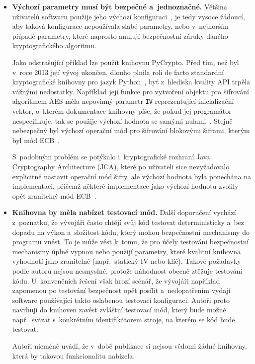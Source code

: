 \begin{itemize}
    \item \textbf{Výchozí parametry musí být bezpečné a~jednoznačné.} \enskip
        Většina uživatelů softwaru použije jeho výchozí konfiguraci~\cite{Daswani2007}, je tedy vysoce žádoucí, aby taková konfigurace nepoužívala slabé parametry, nebo v~nejhorším případě parametry, které naprosto anulují bez\-peč\-nost\-ní záruky daného kryptografického algoritmu.

        Jako odstrašující příklad lze použít knihovnu PyCrypto. Před tím, než byl v~roce 2013 její vývoj ukončen, dlouho plnila roli de facto standardní kryptografické knihovny pro jazyk Python~\cite{keckmasters}, byť z~hlediska kvality API trpěla vážnými nedostatky. Například její funkce pro vytvoření objektu pro šifrování algoritmem AES měla nepovinný parametr \texttt{IV} reprezentující inicializační vektor, o~kterém dokumentace knihovny píše, že pokud jej programátor nespecifikuje, tak se použije výchozí hodnota se samými nulami~\cite{pycryptodoc}. Stejně nebezpečný byl výchozí operační mód pro šifrování blokovými šiframi, kterým byl mód ECB~\cite{das2014iv}.

        S~podobným problém se potýkalo i~kryptografické rozhraní Java Cryptography Architecture (JCA), které po uživateli sice nevyžadovalo explicitně nastavit operační mód šifry, ale výchozí hodnota byla ponechána na implementaci, přičemž některé implementace jako výchozí hodnotu zvolily opět zranitelný mód ECB~\cite{greensmith}.

    \item \textbf{Knihovna by měla nabízet testovací mód.} \enskip
        Další doporučení vychází z~poznatku, že vývojáři často chtějí svůj kód testovat deterministicky a~bez dopadu na výkon a~složitost kódu, který mohou bezpečnostní mechanismy do programu vnést. To je může vést k~tomu, že pro účely testování bezpečnostní mechanismy úplně vypnou nebo použijí parametry, které kvalitní knihovna vyhodnotí jako zranitelné (např.\ statický IV nebo klíč). Takové požadavky podle autorů nejsou nesmyslné, protože náhodnost obecně ztěžuje testování kódu. U~konvenčních řešení však hrozí scénář, že vývojáři například zapomenou po testování bezpečnost opět posílit a~nedopatřením vydají software používající takto oslabenou testovací konfiguraci. Autoři proto navrhují do knihoven zavést zvláštní testovací mód, který bude možné např.\ svázat s~konkrétním identifikátorem stroje, na kterém se kód bude testovat.

        Autoři nicméně uvádí, že v~době publikace si nejsou vědomi žádné knihovny, která by takovou funkcionalitu nabízela.
\end{itemize}

